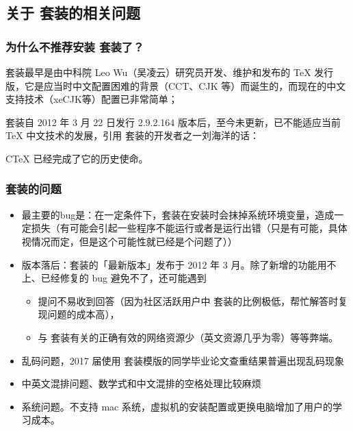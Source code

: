 
\subsection{关于 \CTeX 套装的相关问题}


\subsubsection{为什么不推荐安装 \CTeX 套装了？}

\CTeX 套装最早是由中科院 Leo Wu（吴凌云）研究员开发、维护和发布的 \TeX{} 发行版，它是应当时中文配置困难的背景（CCT、CJK 等）而诞生的，而现在的中文支持技术（xeCJK等）配置已非常简单；

\CTeX 套装自 2012 年 3 月 22 日发行 2.9.2.164 版本后，至今未更新，已不能适应当前 TeX 中文技术的发展，引用 \CTeX 套装的开发者之一刘海洋的话：
\begin{latexexample}
  CTeX 已经完成了它的历史使命。
\end{latexexample}


\subsubsection{\CTeX 套装的问题}

\begin{itemize}
  \item 最主要的bug是：在一定条件下，\CTeX 套装在安装时会抹掉系统环境变量，造成一定损失（有可能会引起一些程序不能运行或者是运行出错（只是有可能，具体视情况而定，但是这个可能性就已经是个问题了））
  \item 版本落后：\CTeX 套装的「最新版本」发布于 2012 年 3 月。除了新增的功能用不上、已经修复的 bug 避免不了，还可能遇到
    \begin{itemize}
      \item 提问不易收到回答（因为社区活跃用户中 \CTeX 套装的比例极低，帮忙解答时复现问题的成本高），
      \item 与 \CTeX 套装有关的正确有效的网络资源少（英文资源几乎为零）等等弊端。
    \end{itemize}
  \item 乱码问题，2017 届使用 \CTeX 套装模版的同学毕业论文查重结果普遍出现乱码现象
  \item 中英文混排问题、数学式和中文混排的空格处理比较麻烦
  \item 系统问题。不支持 mac 系统，虚拟机的安装配置或更换电脑增加了用户的学习成本。
\end{itemize}


